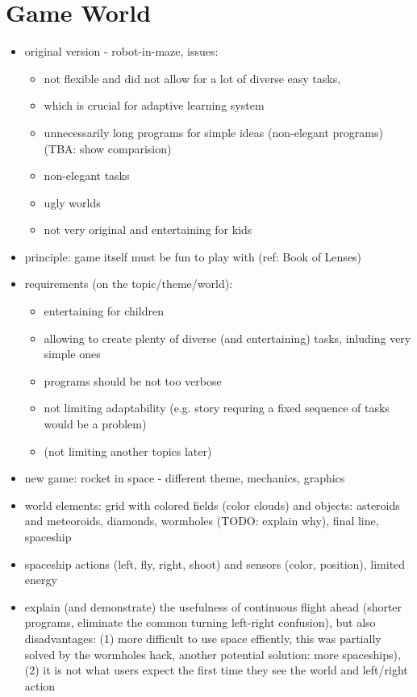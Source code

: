 \section{Game World}
\label{sec:robomission.game-world}

\begin{itemize}
\item original version - robot-in-maze, issues:
  \begin{itemize}
  \item not flexible and did not allow for a lot of diverse easy tasks,
  \item which is crucial for adaptive learning system
  \item unnecessarily long programs for simple ideas (non-elegant programs) (TBA: show comparision)
  \item non-elegant tasks
  \item ugly worlds
  \item not very original and entertaining for kids
  \end{itemize}
\item principle: game itself must be fun to play with (ref: Book of Lenses)
\item requirements (on the topic/theme/world):
  \begin{itemize}
  \item entertaining for children
  \item allowing to create plenty of diverse (and entertaining) tasks, inluding very simple ones
  \item programs should be not too verbose
  \item not limiting adaptability (e.g. story requring a fixed sequence of tasks would be a problem)
  \item (not limiting another topics later)
  \end{itemize}
\item new game: rocket in space - different theme, mechanics, graphics
\item world elements: grid with colored fields (color clouds) and objects: asteroids and meteoroids, diamonds, wormholes (TODO: explain why), final line, spaceship
\item spaceship actions (left, fly, right, shoot) and sensors (color, position), limited energy
\item explain (and demonstrate) the usefulness of continuous flight ahead (shorter programs, eliminate the common turning left-right confusion), but also disadvantages: (1) more difficult to use space effiently, this was partially solved by the wormholes hack, another potential solution: more spaceships), (2) it is not what users expect the first time they see the world and left/right action
\end{itemize}


